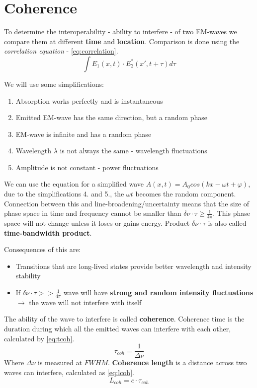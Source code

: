 \chapter{Coherence}

To determine the interoperability - ability to interfere - of two EM-waves we compare them at
different \textbf{time} and \textbf{location}. Comparison is done using the \textit{correlation equation} - \ref{eq:correlation}.
\begin{equation}
    \int E_1(x,t) \cdot E_{2}^* (x',t+\tau) d\tau
    \label{eq:correlation}
\end{equation}

We will use some simplifications:
\begin{enumerate}
    \item Absorption works perfectly and is instantaneous
    \item Emitted EM-wave has the same direction, but a random phase
    \item EM-wave is infinite and has a random phase
    \item Wavelength $\lambda$ is not always the same - wavelength fluctuations
    \item Amplitude is not constant - power fluctuations 
\end{enumerate}
We can use the equation for a simplified wave $A(x,t) = A_0 cos(kx - \omega t + \varphi)$,
due to the simplifications 4. and 5., the $\omega t$ becomes the random component.
Connection between this and line-broadening/uncertainty means that the size of phase space in time and frequency
cannot be smaller than $\delta \nu \cdot \tau  \ge \frac{1}{4 \pi}$.
This phase space will not change unless it loses or gains energy.
Product $\delta \nu \cdot  \tau$ is also called \textbf{time-bandwidth product}.

Consequences of this are:
\begin{itemize}
    \item Transitions that are long-lived states provide better wavelength and intensity stability
    \item If $\delta \nu \cdot \tau >> \frac{1}{4\pi}$ wave will have \textbf{strong and random intensity fluctuations} $\rightarrow$ the wave will not interfere with itself
\end{itemize}
The ability of the wave to interfere is called \textbf{coherence}.
Coherence time is the duration during which all the emitted waves can interfere with each other, calculated by \ref{eq:tcoh}.
\begin{equation}
    \tau_{coh} = \frac{1}{\Delta \nu}
    \label{eq:tcoh}
\end{equation}
Where $\Delta \nu$ is measured at $FWHM$. \textbf{Coherence length} is a distance across two waves can interfere, calculated as \ref{eq:lcoh}.
\begin{equation}
    L_{coh} = c \cdot \tau_{coh}
    \label{eq:lcoh}
\end{equation}

